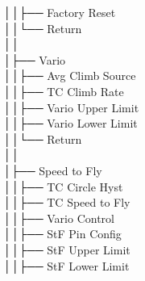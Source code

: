 │\hspace{2em}│\hspace{2em}├── Factory Reset \\
│\hspace{2em}│\hspace{2em}└── Return \\
│\hspace{2em}│\hspace{2em} \\
│\hspace{2em}├── Vario \\
│\hspace{2em}│\hspace{2em}├── Avg Climb Source \\
│\hspace{2em}│\hspace{2em}├── TC Climb Rate \\
│\hspace{2em}│\hspace{2em}├── Vario Upper Limit \\
│\hspace{2em}│\hspace{2em}├── Vario Lower Limit \\
│\hspace{2em}│\hspace{2em}└── Return \\
│\hspace{2em}│\hspace{2em} \\
│\hspace{2em}├── Speed to Fly \\
│\hspace{2em}│\hspace{2em}├── TC Circle Hyst \\
│\hspace{2em}│\hspace{2em}├── TC Speed to Fly \\
│\hspace{2em}│\hspace{2em}├── Vario Control \\
│\hspace{2em}│\hspace{2em}├── StF Pin Config \\
│\hspace{2em}│\hspace{2em}├── StF Upper Limit \\
│\hspace{2em}│\hspace{2em}├── StF Lower Limit \\
